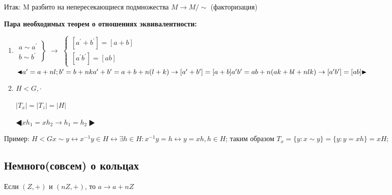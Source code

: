 \documentclass[12pt]{article}
\begin{document}
		
		Итак: M разбито на непересекающиеся подмножества $M\rightarrow M/\sim$ (факторизация)

		\textbf{Пара необходимых теорем о отношениях эквивалентности:}

		\begin{enumerate}
							
		\item $	\left
			.\begin{aligned}
			a\sim a^\prime \\
			b\sim b^\prime
			\end{aligned}
			\right \} $
			$\rightarrow$
			$\begin{cases}
			[a^\prime +b^\prime]=[a+b] \\
			[a^\prime b^\prime]=[ab]
			\end{cases}$\\
		$\LHD a^\prime =a+nl; b^\prime=b+nk \\
		a^\prime+b^\prime=a+b+n(l+k)\rightarrow [a^\prime+b^\prime]=[a+b] \\
		a^\prime b^\prime=ab+n(ak+bl+nlk)\rightarrow [a^\prime b^\prime]=[ab]
		\RHD$
		
		\item $H<G,\cdot$
		
		
			$|T_x|=|T_z|=|H|$
		
		
		$\LHD xh_1=xh_2 \rightarrow h_1=h_2 \RHD$
		\end{enumerate}
		
		
		Пример: $H<G x\sim y \leftrightarrow x^{-1}y \in H \leftrightarrow \exists h\in H: x^{-1}y=h\leftrightarrow y=xh, h\in H$; таким образом $T_x=\{y:x\sim y\}=\{y:y=xh\}=xH;$
		
		
		



		\subsection{Немного(совсем) о кольцах}

		Если $(Z,+)$ и $(nZ,+)$, то $a\rightarrow a+nZ$
		
\end{document}
